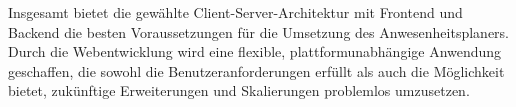 Insgesamt bietet die gewählte Client-Server-Architektur mit Frontend und Backend die besten Voraussetzungen für die Umsetzung des Anwesenheitsplaners. Durch die Webentwicklung wird eine flexible, plattformunabhängige Anwendung geschaffen, die sowohl die Benutzeranforderungen erfüllt als auch die Möglichkeit bietet, zukünftige Erweiterungen und Skalierungen problemlos umzusetzen.




